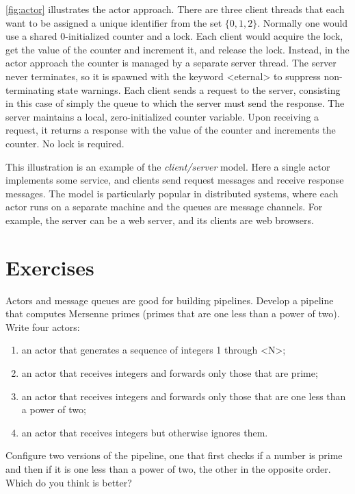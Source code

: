 \documentclass{report}
\begin{document}
\autoref{fig:actor} illustrates the actor approach.
There are three client threads that each want to be assigned
a unique identifier from the set $\{ 0, 1, 2 \}$.
Normally one would use a shared 0-initialized counter and a lock.
Each client would acquire the lock, get the value of the counter
and increment it, and release the lock.
Instead, in the actor approach the counter is managed by a
separate server thread.
The server never terminates, so it is spawned with the keyword
<{eternal}> to suppress non-terminating state warnings.
Each client sends a request to the server, consisting in this case
of simply the queue to which the server must send the response.
The server maintains a local, zero-initialized counter variable.
Upon receiving a request, it returns a response with the value of
the counter and increments the counter.  No lock is required.

This illustration is an example of the \emph{client/server} model.
Here a single actor implements some service, and clients send request
messages and receive response messages.  The model is particularly
popular in distributed systems, where each actor runs on a separate
machine and the queues are message channels.  For example, the server
can be a web server, and its clients are web browsers.

\section*{Exercises}
\begin{problems}
\item Actors and message queues are good for building pipelines.
Develop a pipeline that computes Mersenne primes (primes that are one less
than a power of two).  Write four actors:
\begin{enumerate}
\item an actor that generates a sequence of integers 1 through <{N}>;
\item an actor that receives integers and forwards only those that are prime;
\item an actor that receives integers and forwards only those that are one
less than a power of two;
\item an actor that receives integers but otherwise ignores them.
\end{enumerate}
Configure two versions of the pipeline, one that first checks if a number
is prime and then if it is one less than a power of two, the other
in the opposite order.  Which do you think is better?
\end{problems}
\end{document}
